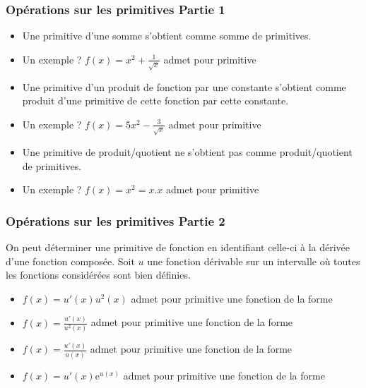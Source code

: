 \documentclass[11pt, hyperref={urlcolor=red,%
            linkcolor=blue, %
            colorlinks=true}]{beamer}
\newcommand{\valabs}[1]{\big| \, #1 \, \big|}
\begin{document}
\begin{frame}
\frametitle{Opérations sur les primitives Partie 1}
\label{primop}



\begin{itemize}

 \item Une primitive d'une somme s'obtient comme somme de primitives.
 \pause \item Un exemple ? $f(x)=x^{2}+\frac{1}{\sqrt{x}}$ admet pour primitive 
  \item Une primitive d'un produit de fonction par une constante s'obtient comme produit d'une primitive de cette fonction par cette constante.
 \pause \item Un exemple ? $f(x)=5x^{2}-\frac{3}{\sqrt{x}}$ admet pour primitive 
 \item \bcattention Une primitive de produit/quotient ne s'obtient pas comme produit/quotient  de primitives.
 \pause \item Un exemple ?  $f(x)=x^{2}=x . x$ admet pour primitive 
\end{itemize}

\end{frame}




\begin{frame}
\frametitle{Opérations sur les primitives Partie 2}
\label{primop}

On peut déterminer une primitive de fonction en identifiant celle-ci à la dérivée d'une fonction composée.
Soit $u$ une fonction dérivable sur un intervalle où toutes les fonctions considérées sont bien définies.

\begin{itemize}


 \item $f(x)=u'(x)u^{2}(x)$ admet pour primitive une  fonction de la forme 
 \item $f(x)=\frac{u'(x)}{u^{2}(x)}$ admet pour primitive une  fonction de la forme 
 \item $f(x)=\frac{u'(x)}{u(x)}$  admet pour primitive une  fonction de la forme \uncover<3->{$F(x)= \ln(\valabs{u(x)})+k$ avec $k$ constante}
  \item $f(x)=u'(x)\text{e}^{u(x)}$  admet pour primitive une  fonction de la forme 
\end{itemize}

\end{frame}
\end{document}
